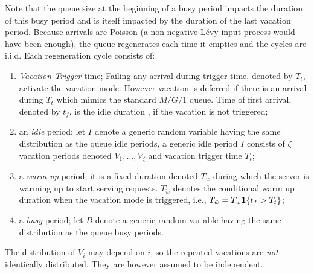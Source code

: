 \documentclass[journal]{IEEEtran}
\def\bone{{\mathrm 1\!\!I}}
\def\bone{{\textbf 1}}
\begin{document}
Note that the queue size at the beginning of a busy period impacts the duration of this busy period and is itself impacted by the duration of the last vacation period. Because arrivals are Poisson (a non-negative
L\'{e}vy input process would have been enough), the queue regenerates each time it empties and the cycles are i.i.d. Each regeneration cycle consists of:
\begin{enumerate}
\item {\em Vacation Trigger } time; Failing any arrival during trigger time, denoted by $T_t$, activate the vacation mode. However vacation is deferred if there is an arrival during $T_t$ which mimics the standard ${M/G/1}$ queue. Time of first arrival, denoted by $t_f$, is the idle duration , if the vacation is not triggered;
\item an {\em idle} period; let $I$ denote a generic random variable having
the same distribution as the queue idle periods, a generic idle
period $I$ consists of $\zeta$ vacation periods denoted $V_1,\ldots,V_\zeta$ and vacation trigger time $T_t$;
\item a {\em warm-up} period; it is a fixed duration denoted $T_{w}$ during which the server is warming up to start serving requests. $T_{\tilde{w}}$ denotes the conditional warm up duration when the vacation mode is triggered, i.e., $T_{\tilde{w}}=T_w\bone\{t_f>T_t\}$;
\item a {\em busy} period; let $B$ denote a generic random variable having
the same distribution as the queue busy periods. 
\end{enumerate}
The distribution of $V_i$ may depend on $i$, so the repeated vacations are {\em not} identically distributed. They are however assumed to be independent.
\end{document}
